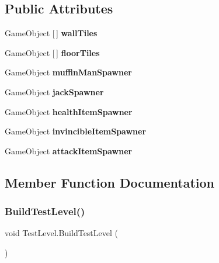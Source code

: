 \subsection*{Public Attributes}
\begin{DoxyCompactItemize}
\item 
\mbox{\label{class_test_level_a1b517c351d28f2e214f2a4ffcecd98b4}} 
Game\+Object \mbox{[}$\,$\mbox{]} {\bfseries wall\+Tiles}
\item 
\mbox{\label{class_test_level_a1378b22cc8c3128b2de1b933a6f0d574}} 
Game\+Object \mbox{[}$\,$\mbox{]} {\bfseries floor\+Tiles}
\item 
\mbox{\label{class_test_level_aed8bd275dd8159fb0fd3e5033244234a}} 
Game\+Object {\bfseries muffin\+Man\+Spawner}
\item 
\mbox{\label{class_test_level_a17aaa8874ebb24bdf00ccd79ca9fabda}} 
Game\+Object {\bfseries jack\+Spawner}
\item 
\mbox{\label{class_test_level_af0fc2bc686159feb9dec976899ae7a1a}} 
Game\+Object {\bfseries health\+Item\+Spawner}
\item 
\mbox{\label{class_test_level_abb2b6d9e0b6f37021873c89de819032c}} 
Game\+Object {\bfseries invincible\+Item\+Spawner}
\item 
\mbox{\label{class_test_level_ad6b394505c2aa79d09340a9ad47ddeb1}} 
Game\+Object {\bfseries attack\+Item\+Spawner}
\end{DoxyCompactItemize}


\subsection{Member Function Documentation}
\mbox{\label{class_test_level_a6834e350643e7c5bf7ed27d2632f2c92}} 
\subsubsection{\texorpdfstring{Build\+Test\+Level()}{BuildTestLevel()}}
{\footnotesize\ttfamily void Test\+Level.\+Build\+Test\+Level (\begin{DoxyParamCaption}{ }\end{DoxyParamCaption})\hspace{0.3cm}{\ttfamily [inline]}}

